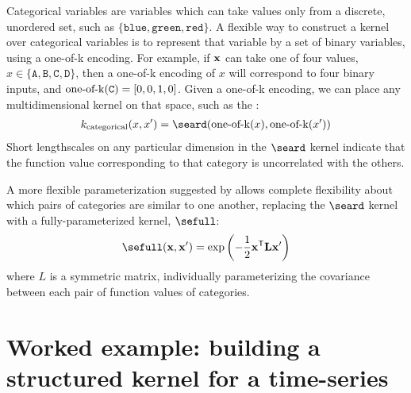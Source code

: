 Categorical variables are variables which can take values only from a discrete, unordered set, such as $\{\texttt{blue}, \texttt{green}, \texttt{red}\}$.
A flexible way to construct a kernel over categorical variables is to represent that variable by a set of binary variables, using a one-of-k encoding.
For example, if ${\bf{x}}$ can take one of four values, $x \in \{ \texttt{A}, \texttt{B}, \texttt{C}, \texttt{D}\}$, then a one-of-k encoding of $x$ will correspond to four binary inputs, and $\operatorname{one-of-k}(\texttt{C}) = [0, 0, 1, 0]$.
Given a one-of-k encoding, we can place any multidimensional kernel on that space, such as the \seard{}:
%
\begin{align}
k_{\textnormal{categorical}}( x, x') = \seard( \oneofk(x), \oneofk(x') )
\end{align}
%
Short lengthscales on any particular dimension in the $\seard$ kernel indicate that the function value corresponding to that category is uncorrelated with the others.

A more flexible parameterization suggested by \citet{swersky2013categorical} allows complete flexibility about which pairs of categories are similar to one another, replacing the $\seard$ kernel with a fully-parameterized kernel, $\sefull$:
%
\begin{align}
\sefull( \vx, \vx') = \exp \left( -\frac{1}{2} \vx\tra \vL \vx' \right)
\end{align}
%
where $L$ is a symmetric matrix, individually parameterizing the covariance between each pair of function values of categories.










\iffalse

\section{Worked example: building a structured kernel for a time-series}

